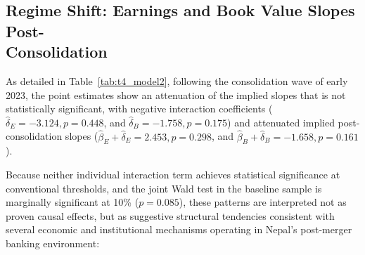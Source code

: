 \subsection[Regime Shift: Earnings and Book Value Slopes Post-Consolidation]{Regime Shift: Earnings and Book Value Slopes Post-\\Consolidation}
As detailed in Table~\ref{tab:t4_model2}, following the consolidation wave of early 2023, the point estimates show an attenuation of the implied slopes that is not statistically significant, with negative interaction coefficients ($\hat{\delta}_E = -3.124, p = 0.448$, and $\hat{\delta}_B = -1.758, p = 0.175$) and attenuated implied post-consolidation slopes ($\hat{\beta}_E + \hat{\delta}_E = 2.453, p = 0.298$, and $\hat{\beta}_B + \hat{\delta}_B = -1.658, p = 0.161$).

Because neither individual interaction term achieves statistical significance at conventional thresholds, and the joint Wald test in the baseline sample is marginally significant at 10\% ($p = 0.085$), these patterns are interpreted not as proven causal effects, but as suggestive structural tendencies consistent with several economic and institutional mechanisms operating in Nepal's post-merger banking environment:
